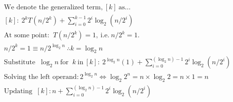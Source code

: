 \begin{align*}
& \text{We denote the generalized term,} \ [k] \ \text{as}\ldots \\
& [k]: \ 2^k T(n/2^k) + \sum_{i=0}^{k-1} 2^i \log_2 (n/2^i) \\
& \text{At some point: } \ T(n/2^k) = 1, \ \text{i.e.} \ n/2^k = 1. \\
& n/2^k = 1 \equiv n/2^{\log_2 n} \ \therefore k = \log_2 n \\
& \text{Substitute } \ \log_2 n \ \text{for } \ k \ \text{in} \ [k]: \
{2^{\log_2 n}}(1) + \sum_{i=0}^{(\log_2 n)-1} 2^i \log_2 (n/2^i) \\
& \text{Solving the left operand}: 2^{\log_2 n} \Leftrightarrow \log_2 2^n = n \times \log_2 2 = n \times 1 = n \\
& \text{Updating } \ [k]: n + \sum_{i=0}^{(\log_2 n)-1} 2^i \log_2 (n/2^i) \\
\end{align*}